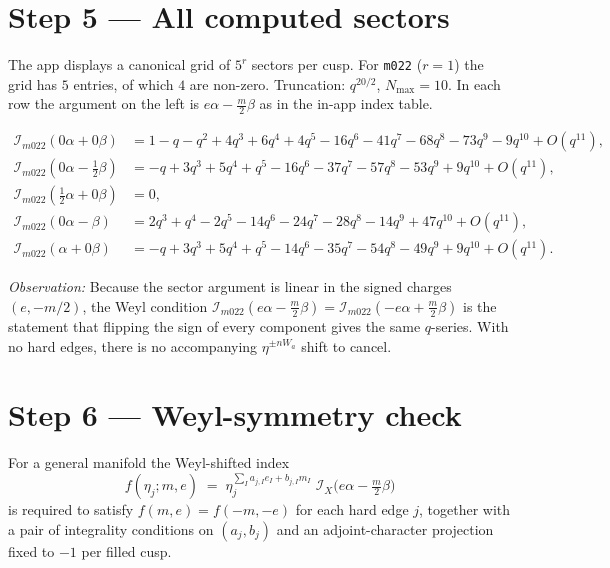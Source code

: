 \documentclass[11pt,a4paper]{article}
\newcommand{\I}{\mathcal{I}}                          %
\renewcommand{\Im}{\mathcal{I}_{m022}}                %
\begin{document}
\section{Step 5 --- All computed sectors}

The app displays a canonical grid of \(5^r\) sectors per cusp.  For
\texttt{m022} (\(r=1\)) the grid has \(5\) entries, of which \(4\) are
non-zero.  Truncation: \(q^{20/2}\), \(N_{\max}=10\).  In each row the
argument on the left is
\(e\alpha - \tfrac{m}{2}\beta\) as in the in-app index table.

\begin{align*}
\Im\!\left(0\alpha + 0\beta\right) &=
  1 - q - q^{2} + 4q^{3} + 6q^{4} + 4q^{5}
  - 16q^{6} - 41q^{7} - 68q^{8} - 73q^{9}
  - 9q^{10} + O(q^{11}), \\[2pt]
\Im\!\left(0\alpha - \tfrac{1}{2}\beta\right) &=
  -q + 3q^{3} + 5q^{4} + q^{5} - 16q^{6}
  - 37q^{7} - 57q^{8} - 53q^{9} + 9q^{10} + O(q^{11}), \\[2pt]
\Im\!\left(\tfrac{1}{2}\alpha + 0\beta\right) &= 0, \\[2pt]
\Im\!\left(0\alpha - \beta\right) &=
  2q^{3} + q^{4} - 2q^{5} - 14q^{6} - 24q^{7}
  - 28q^{8} - 14q^{9} + 47q^{10} + O(q^{11}), \\[2pt]
\Im\!\left(\alpha + 0\beta\right) &=
  -q + 3q^{3} + 5q^{4} + q^{5} - 14q^{6}
  - 35q^{7} - 54q^{8} - 49q^{9} + 9q^{10} + O(q^{11}).
\end{align*}

\emph{Observation:} Because the sector argument is linear in the signed
charges \((e,-m/2)\), the Weyl condition
\(\Im(e\alpha-\tfrac{m}{2}\beta) = \Im(-e\alpha+\tfrac{m}{2}\beta)\)
is the statement that flipping the sign of every component gives the
same \(q\)-series.  With no hard edges, there is no accompanying
\(\eta^{\pm nW_a}\) shift to cancel.

\section{Step 6 --- Weyl-symmetry check}
\label{sec:weyl}

For a general manifold the Weyl-shifted index
\[
f(\eta_j; m, e) \;=\;
   \eta_j^{\sum_I a_{j,I}e_I + b_{j,I}m_I}\;
   \I_{\!X}\!\bigl(e\alpha - \tfrac{m}{2}\beta\bigr)
\]
is required to satisfy \(f(m,e) = f(-m,-e)\) for each hard edge \(j\),
together with a pair of integrality conditions on \((a_j, b_j)\) and an
adjoint-character projection fixed to \(-1\) per filled cusp.
\end{document}
